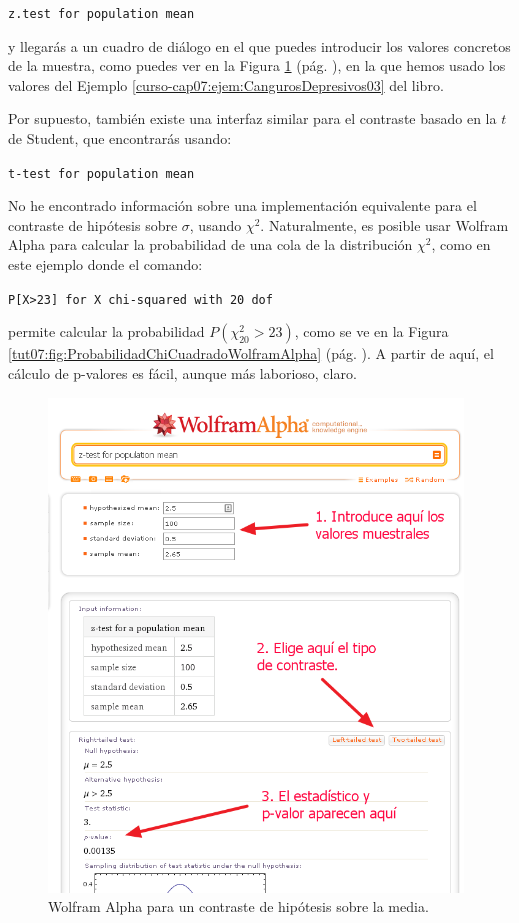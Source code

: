 \documentclass[10pt,a4paper]{article}\usepackage[]{graphicx}\usepackage[]{color}
\newcounter {cont01}
\begin{document}
{\tt z.test for population mean}

y llegarás a un cuadro de diálogo en el que puedes introducir los valores concretos de la muestra, como puedes ver en la Figura \ref{tut07:fig:contrasteHipotesisMediaWolframAlpha} (pág. \pageref{tut07:fig:contrasteHipotesisMediaWolframAlpha}), en la que hemos usado los valores del Ejemplo \ref{curso-cap07:ejem:CangurosDepresivos03} del libro.


Por supuesto, también existe una interfaz similar para el contraste basado en la $t$ de Student, que encontrarás usando:

{\tt t-test for population mean}

No he encontrado información sobre una implementación equivalente para el contraste de hipótesis sobre $\sigma$, usando $\chi^2$. Naturalmente, es posible usar Wolfram Alpha para calcular la probabilidad de una cola de la distribución $\chi^2$, como en este ejemplo donde el comando:

{\tt P[X>23] for X~chi-squared with 20 dof}

permite calcular la probabilidad $P(\chi^2_{20}>23)$, como se ve en la Figura  \ref{tut07:fig:ProbabilidadChiCuadradoWolframAlpha} (pág. \pageref{tut07:fig:ProbabilidadChiCuadradoWolframAlpha}). A partir de aquí, el cálculo de p-valores es fácil, aunque más laborioso, claro.


\begin{figure}[h!]
\begin{center}
    \includegraphics[width=11cm]{../fig/Tut07-02.png}
\end{center}
\caption{Wolfram Alpha para un contraste de hipótesis sobre la media.}
\label{tut07:fig:contrasteHipotesisMediaWolframAlpha}
\end{figure}
\end{document}
